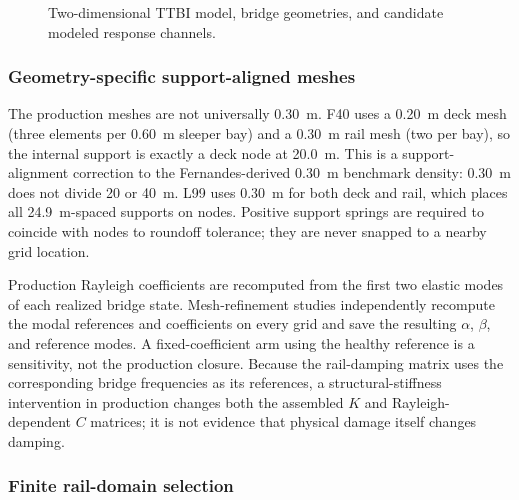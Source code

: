 \begin{figure}[htbp]
\centering
{}
\caption{Two-dimensional TTBI model, bridge geometries, and candidate modeled
response channels.}
\label{fig:model}
\end{figure}

\subsubsection{Geometry-specific support-aligned meshes}
\label{sec:mesh}

The production meshes are not universally 0.30~m. F40 uses a 0.20~m deck mesh
(three elements per 0.60~m sleeper bay) and a 0.30~m rail mesh (two per bay), so
the internal support is exactly a deck node at 20.0~m. This is a
support-alignment correction to the Fernandes-derived 0.30~m benchmark density:
0.30~m does not divide 20 or 40~m. L99 uses 0.30~m for both deck and rail,
which places all 24.9~m-spaced supports on nodes. Positive support springs are
required to coincide with nodes to roundoff tolerance; they are never snapped
to a nearby grid location.

Production Rayleigh coefficients are recomputed from the first two elastic
modes of each realized bridge state. Mesh-refinement studies independently
recompute the modal references and coefficients on every grid and save the
resulting $\alpha$, $\beta$, and reference modes. A fixed-coefficient arm using
the healthy reference is a sensitivity, not the production closure. Because
the rail-damping matrix uses the corresponding bridge frequencies as its
references, a structural-stiffness intervention in production changes both the
assembled $K$ and Rayleigh-dependent $C$ matrices; it is not evidence that
physical damage itself changes damping.

\subsubsection{Finite rail-domain selection}
\label{sec:rail_clearance}

